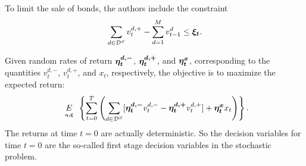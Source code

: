 To limit the sale of bonds, the authors \cite{frauendorfer97} include the constraint
\begin{equation*}
\sum_{d\in {\cal D}^S} v_t^{d,+} - \sum_{d=1}^M v_{t-1}^d \leq \mathbf{\boldsymbol{\xi_t}}.
\end{equation*}

Given random rates of return $\mathbf{\boldsymbol{\eta_t^{d,-}}}$, $\mathbf{\boldsymbol{\eta_t^{d,+}}}$, and $\mathbf{\boldsymbol{\eta_t^x}}$, corresponding to the quantities $v_t^{d,-}$, $v_t^{d,+}$, and $x_t$, respectively, the objective is to maximize the expected return:
\begin{equation*}
\expect[\eta, \xi]\left\{\sum_{t=0}^T \left(\sum_{d\in {\cal D}^S} [\rand{\eta_t^{d,-}}v_t^{d,-} - \rand{\eta_t^{d,+}}v_t^{d,+}] + \rand{\eta_t^x}x_t \right) \right\}.
\end{equation*}
The returns at time $t=0$ are actually deterministic.  So the decision variables for time $t=0$ are the so-called first stage decision variables in the stochastic problem.




